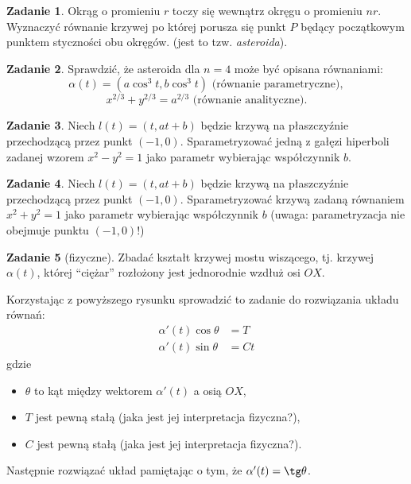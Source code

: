 \documentclass[a4paper,11pt]{article}
\theoremstyle{definition}\newtheorem{exercise}{Zadanie}
\theoremstyle{definition}\newtheorem{remark}{Uwaga}
\begin{document}
\begin{exercise}
Okrąg o promieniu $r$ toczy się wewnątrz okręgu o promieniu $nr$. Wyznaczyć 
r\'ownanie krzywej po kt\'orej porusza się punkt $P$ będący początkowym punktem 
styczności obu okręg\'ow. (jest to tzw. \textit{asteroida}).
\end{exercise}

\begin{exercise}
 Sprawdzić, że asteroida dla $n=4$ może być opisana równaniami:
\[\alpha(t)=\left(a \cos^3{t},b\cos^3{t}\right)\text{ (r\'ownanie 
parametryczne)},\] 
\[x^{2/3}+y^{2/3}=a^{2/3}\text{ (r\'ownanie analityczne)}.\]
\end{exercise}

\begin{exercise}
Niech $l(t)=(t,at+b)$ będzie krzywą na płaszczyźnie przechodzącą przez punkt 
$(-1,0)$. Sparametryzować jedną z gałęzi hiperboli zadanej wzorem $x^2-y^2=1$ 
jako parametr wybierając współczynnik $b$.
\end{exercise}

\begin{exercise}
Niech $l(t)=(t,at+b)$ będzie krzywą na płaszczyźnie przechodzącą przez punkt 
$(-1,0)$. Sparametryzować krzywą zadaną równaniem $x^2+y^2=1$ jako parametr 
wybierając współczynnik $b$ (uwaga: parametryzacja nie obejmuje punktu 
$(-1,0)$!)
\end{exercise}



\begin{exercise}[fizyczne]
Zbadać kształt krzywej mostu wiszącego, tj. krzywej $\alpha(t)$, kt\'orej 
``ciężar'' rozłożony jest jednorodnie wzdłuż osi $OX$. 

Korzystając z powyższego rysunku sprowadzić to zadanie do rozwiązania układu 
równań:
\begin{align*}
\alpha'(t)\cos\theta&=T\\
\alpha'(t)\sin\theta&=Ct
\end{align*}
gdzie 
\begin{itemize}
 \item $\theta$ to kąt między wektorem $\alpha'(t)$ a osią $OX$, 
 \item $T$ jest pewną stałą (jaka jest jej interpretacja fizyczna?),
 \item $C$ jest pewną stałą (jaka jest jej interpretacja fizyczna?).
\end{itemize}
Następnie rozwiązać układ pamiętając o tym, że $\alpha'(t)=\tg\theta$.
\end{exercise}
\end{document}
